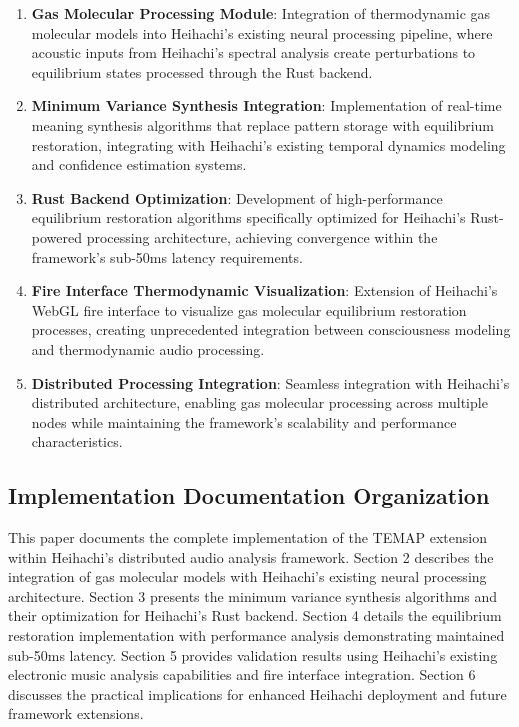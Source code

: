 \documentclass[12pt,a4paper]{article}
\begin{document}
\begin{enumerate}
\item \textbf{Gas Molecular Processing Module}: Integration of thermodynamic gas molecular models into Heihachi's existing neural processing pipeline, where acoustic inputs from Heihachi's spectral analysis create perturbations to equilibrium states processed through the Rust backend.

\item \textbf{Minimum Variance Synthesis Integration}: Implementation of real-time meaning synthesis algorithms that replace pattern storage with equilibrium restoration, integrating with Heihachi's existing temporal dynamics modeling and confidence estimation systems.

\item \textbf{Rust Backend Optimization}: Development of high-performance equilibrium restoration algorithms specifically optimized for Heihachi's Rust-powered processing architecture, achieving convergence within the framework's sub-50ms latency requirements.

\item \textbf{Fire Interface Thermodynamic Visualization}: Extension of Heihachi's WebGL fire interface to visualize gas molecular equilibrium restoration processes, creating unprecedented integration between consciousness modeling and thermodynamic audio processing.

\item \textbf{Distributed Processing Integration}: Seamless integration with Heihachi's distributed architecture, enabling gas molecular processing across multiple nodes while maintaining the framework's scalability and performance characteristics.
\end{enumerate}

\subsection{Implementation Documentation Organization}

This paper documents the complete implementation of the TEMAP extension within Heihachi's distributed audio analysis framework. Section 2 describes the integration of gas molecular models with Heihachi's existing neural processing architecture. Section 3 presents the minimum variance synthesis algorithms and their optimization for Heihachi's Rust backend. Section 4 details the equilibrium restoration implementation with performance analysis demonstrating maintained sub-50ms latency. Section 5 provides validation results using Heihachi's existing electronic music analysis capabilities and fire interface integration. Section 6 discusses the practical implications for enhanced Heihachi deployment and future framework extensions.
\end{document}
